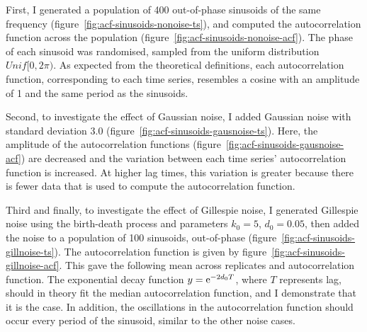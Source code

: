 First, I generated a population of 400 out-of-phase sinusoids of the same frequency (figure~\ref{fig:acf-sinusoids-nonoise-ts}), and computed the autocorrelation function across the population (figure~\ref{fig:acf-sinusoids-nonoise-acf}).
The phase of each sinusoid was randomised, sampled from the uniform distribution \(Unif[0,2\pi)\).
As expected from the theoretical definitions, each autocorrelation function, corresponding to each time series, resembles a cosine with an amplitude of 1 and the same period as the sinusoids.

Second, to investigate the effect of Gaussian noise, I added Gaussian noise with standard deviation 3.0 (figure~\ref{fig:acf-sinusoids-gausnoise-ts}).
Here, the amplitude of the autocorrelation functions (figure~\ref{fig:acf-sinusoids-gausnoise-acf}) are decreased and the variation between each time series' autocorrelation function is increased.
At higher lag times, this variation is greater because there is fewer data that is used to compute the autocorrelation function.

Third and finally, to investigate the effect of Gillespie noise, I generated Gillespie noise using the birth-death process and parameters $k_{0} = 5$, $d_{0} = 0.05$, then added the noise to a population of 100 sinusoids, out-of-phase (figure~\ref{fig:acf-sinusoids-gillnoise-ts}).
The autocorrelation function is given by figure~\ref{fig:acf-sinusoids-gillnoise-acf}.
This gave the following mean across replicates and autocorrelation function.
The exponential decay function $y = \mathrm{e}^{-2d_{0}T}$, where $T$ represents lag, should in theory fit the median autocorrelation function, and I demonstrate that it is the case.
In addition, the oscillations in the autocorrelation function should occur every period of the sinusoid, similar to the other noise cases.

